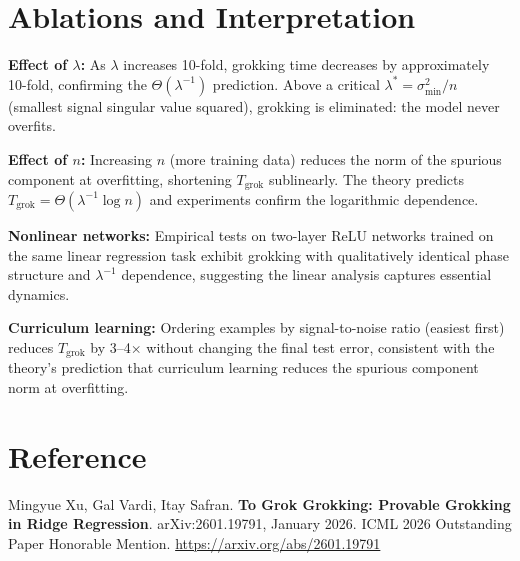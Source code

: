 \documentclass[10pt,twocolumn]{article}
\begin{document}
\section{Ablations and Interpretation}

\textbf{Effect of $\lambda$:} As $\lambda$ increases 10-fold, grokking time
decreases by approximately 10-fold, confirming the $\Theta(\lambda^{-1})$
prediction. Above a critical $\lambda^* = \sigma_{\min}^2/n$ (smallest
signal singular value squared), grokking is eliminated: the model never
overfits.

\textbf{Effect of $n$:} Increasing $n$ (more training data) reduces the
norm of the spurious component at overfitting, shortening $T_{\text{grok}}$
sublinearly. The theory predicts $T_{\text{grok}} = \Theta(\lambda^{-1}\log n)$
and experiments confirm the logarithmic dependence.

\textbf{Nonlinear networks:} Empirical tests on two-layer ReLU networks
trained on the same linear regression task exhibit grokking with qualitatively
identical phase structure and $\lambda^{-1}$ dependence, suggesting the
linear analysis captures essential dynamics.

\textbf{Curriculum learning:} Ordering examples by signal-to-noise ratio
(easiest first) reduces $T_{\text{grok}}$ by 3--4$\times$ without changing
the final test error, consistent with the theory's prediction that curriculum
learning reduces the spurious component norm at overfitting.

\section*{Reference}

Mingyue Xu, Gal Vardi, Itay Safran.
\textbf{To Grok Grokking: Provable Grokking in Ridge Regression}.
arXiv:2601.19791, January 2026. ICML 2026 Outstanding Paper Honorable Mention.
\url{https://arxiv.org/abs/2601.19791}
\end{document}
